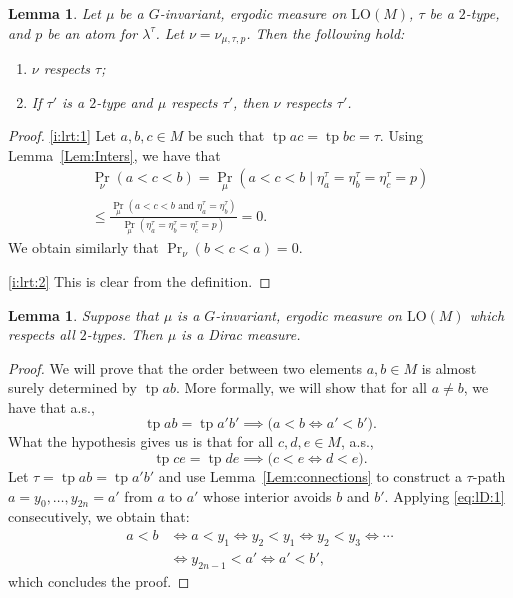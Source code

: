 \documentclass[JEP,XML,SOM,Unicode,published]{cedram}
\theoremstyle{plain}
\newtheorem{lemma}[theorem]{Lemma}
\theoremstyle{definition}
\DeclareMathOperator{\tp}{tp}
\newcommand{\LO}{\mathrm{LO}}
\renewcommand{\And}{\text{ and }}
\begin{document}
\begin{lemma}
\label{l:respecting-types}
Let $\mu$ be a $G$-invariant, ergodic measure on $\LO(M)$, $\tau$ be a $2$-type, and $p$ be an atom for $\lambda^\tau$. Let $\nu = \nu_{\mu, \tau, p}$. Then the following hold:
\begin{enumerate}
\item \label{i:lrt:1} $\nu$ respects $\tau$;
\item \label{i:lrt:2} If $\tau'$ is a $2$-type and $\mu$ respects $\tau'$, then $\nu$ respects $\tau'$.
\end{enumerate}
\end{lemma}
\skpt
\begin{proof}
\eqref{i:lrt:1} Let $a, b, c \in M$ be such that $\tp ac = \tp bc = \tau$. Using Lemma~\ref{Lem:Inters}, we have that
\begin{equation*}
\begin{split}
\Pr_\nu(a < c < b) = \Pr_\mu(a < c < b \mid \eta^\tau_a = \eta^\tau_b = \eta^\tau_c = p) \\
\leq \frac{\Pr_\mu(a < c < b \And \eta^\tau_a = \eta^\tau_b)}{\Pr_\mu(\eta^\tau_a = \eta^\tau_b = \eta^\tau_c = p)} = 0.
\end{split}
\end{equation*}
We obtain similarly that $\Pr_\nu(b < c < a) = 0$.

\eqref{i:lrt:2} This is clear from the definition.
\end{proof}

\begin{lemma}
\label{l:Dirac}
Suppose that $\mu$ is a $G$-invariant, ergodic measure on $\LO(M)$ which respects all $2$-types. Then $\mu$ is a Dirac measure.
\end{lemma}
\begin{proof}
We will prove that the order between two elements $a, b \in M$ is almost surely determined by $\tp ab$. More formally, we will show that for all $a \neq b$, we have that a.s.,\vspace*{-3pt}
\begin{equation*}
\tp ab = \tp a'b' \implies \big(a < b \iff a' < b' \big).
\end{equation*}
What the hypothesis gives us is that for all $c, d, e \in M$, a.s.,\vspace*{-3pt}
\begin{equation}
\label{eq:lD:1}
\tp ce = \tp de \implies \big(c < e \iff d < e \big).
\end{equation}
Let $\tau = \tp ab = \tp a'b'$ and use Lemma~\ref{Lem:connections} to construct a $\tau$-path $a = y_0, \ldots, y_{2n} = a'$ from $a$ to $a'$ whose interior avoids $b$ and $b'$. Applying \eqref{eq:lD:1} consecutively, we obtain that:\vspace*{-7pt}\enlargethispage{.8\baselineskip}%
\begin{equation*}
\begin{split}
a < b &\iff a < y_1 \iff y_2 < y_1 \iff y_2 < y_3 \iff \cdots \\
&\iff y_{2n-1} < a' \iff a' < b',
\end{split}
\end{equation*}
which concludes the proof.
\end{proof}
\end{document}

